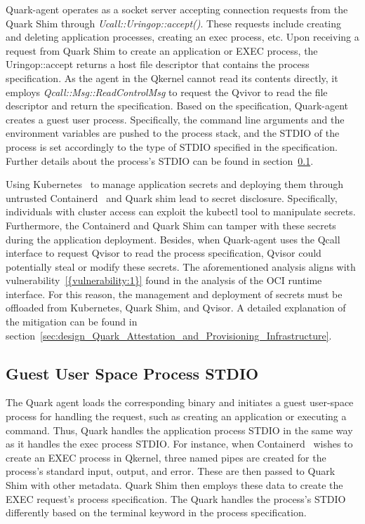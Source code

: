 Quark-agent operates as a socket server accepting connection requests from the Quark Shim through \emph{Ucall::Uringop::accept()}. These requests include creating and deleting application processes, creating an exec process, etc. Upon receiving a request from Quark Shim to create an application or EXEC process, the Uringop::accept returns a host file descriptor 
that contains the process specification. As the agent in the Qkernel cannot read its contents directly, it employs \emph{Qcall::Msg::ReadControlMsg} to request the Qvivor to read the file descriptor and return the specification. Based on the specification, Quark-agent creates a guest user process. Specifically, the command line arguments and the environment variables 
are pushed to the process stack, and the STDIO of the process is set accordingly to the type of STDIO specified in the specification. Further details about the process's STDIO can be found in section~\ref{sec:security_analyse_STDIO}.


Using Kubernetes~\cite*{k8s} to manage application secrets and deploying them through untrusted Containerd~\cite*{containerd} and Quark shim lead to secret disclosure. Specifically, individuals with cluster access can exploit the kubectl tool to manipulate secrets. Furthermore, the Containerd and Quark Shim can tamper with these secrets during the application deployment. Besides, 
when Quark-agent uses the Qcall interface to request Qvisor to read the process specification, Qvisor could potentially steal or modify these secrets.  The aforementioned analysis aligns with vulnerability~\ref{{vulnerability:1}} found in the analysis of the OCI runtime interface. For this reason, the management and deployment of secrets must be offloaded from Kubernetes, Quark Shim, 
and Qvisor. A detailed explanation of the mitigation can be found in section~\ref{sec:design_Quark_Attestation_and_Provisioning_Infrastructure}.


\subsection{Guest User Space Process STDIO}
\label{sec:security_analyse_STDIO}

The Quark agent loads the corresponding binary and initiates a guest user-space process for handling the request, such as creating an application or executing a command. Thus, Quark handles the application process STDIO in the same way as it handles the exec process STDIO. For instance, when Containerd~\cite*{containerd} wishes to create an EXEC process in Qkernel, 
three named pipes are created for the process's standard input, output, and error. These are then passed to Quark Shim with other metadata. Quark Shim then employs these data to create the EXEC request's process specification. The Quark handles the process's STDIO differently based on the terminal keyword in the process specification.


